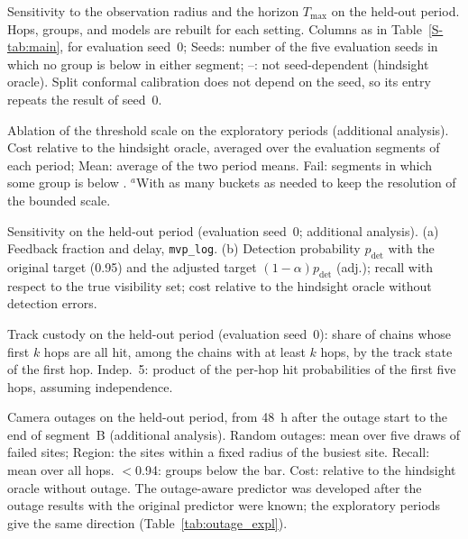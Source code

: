 \begin{table}[t]
\centering
\caption{Sensitivity to the observation radius and the horizon $T_{\max}$ on
the held-out period. Hops, groups, and models are rebuilt for each setting.
Columns as in Table~\ref{S-tab:main}, for evaluation seed~0; Seeds: number of the
five evaluation seeds in which no group is below \groupBar in either segment;
--: not seed-dependent (hindsight oracle). Split conformal calibration does not
depend on the seed, so its entry repeats the result of seed~0.}
\label{tab:geometry}
\footnotesize

\end{table}

\begin{table}[!htbp]
\centering
\caption{Ablation of the threshold scale on the exploratory periods (additional
analysis). Cost relative to the hindsight oracle, averaged over the evaluation
segments of each period; Mean: average of the two period means. Fail: segments in
which some group is below \groupBar. $^{a}$With as many buckets as needed to keep
the resolution of the bounded scale.}
\label{tab:ablation}
\footnotesize

\end{table}

\begin{table}[!htbp]
\centering
\caption{Sensitivity on the held-out period (evaluation seed~0; additional
analysis). (a) Feedback fraction and delay, \texttt{mvp\_log}. (b) Detection
probability $p_{\mathrm{det}}$ with the original target (0.95) and the adjusted
target $(1-\alpha)p_{\mathrm{det}}$ (adj.); recall with respect to the true
visibility set; cost relative to the hindsight oracle without detection errors.}
\label{tab:sensitivity}
\footnotesize

\end{table}

\begin{table}[t]
\centering
\caption{Track custody on the held-out period (evaluation seed~0): share of
chains whose first $k$ hops are all hit, among the chains with at least $k$ hops,
by the track state of the first hop. Indep.~5: product of the per-hop hit
probabilities of the first five hops, assuming independence.}
\label{tab:custody}
\footnotesize

\end{table}

\begin{table}[t]
\centering
\caption{Camera outages on the held-out period, from 48~h after the outage start
to the end of segment~B (additional analysis). Random outages: mean over five
draws of failed sites; Region: the \regionSites sites within a fixed radius of the
busiest site. Recall: mean over all hops. $<$0.94: groups below the bar. Cost:
relative to the hindsight oracle without outage. The outage-aware predictor was
developed after the outage results with the original predictor were known; the
exploratory periods give the same direction (Table~\ref{tab:outage_expl}).}
\label{tab:outage}
\footnotesize

\end{table}

